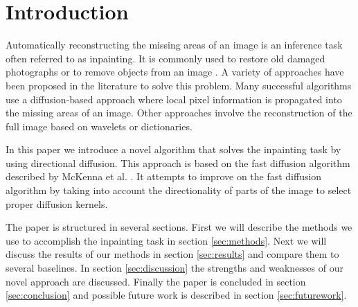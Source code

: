 \section{Introduction}
\label{sec:introduction}

Automatically reconstructing the missing areas of an image is an inference task often referred to as inpainting. It is commonly used to restore old damaged photographs or to remove objects from an image \cite{bertalmio2000image}. A variety of approaches have been proposed in the literature to solve this problem. Many successful algorithms use a diffusion-based approach where local pixel information is propagated into the missing areas of an image. Other approaches involve the reconstruction of the full image based on wavelets or dictionaries.

In this paper we introduce a novel algorithm that solves the inpainting task by using  directional diffusion. This approach is based on the fast diffusion algorithm described by McKenna et al. \cite{richard2001fast}. It attempts to improve on the fast diffusion algorithm by taking into account the directionality of parts of the image to select proper diffusion kernels.

The paper is structured in several sections. First we will describe the methods we use to accomplish the inpainting task in section \ref{sec:methods}. Next we will discuss the results of our methods in section \ref{sec:results} and compare them to several baselines. In section \ref{sec:discussion} the strengths and weaknesses of our novel approach are discussed. Finally the paper is concluded in section \ref{sec:conclusion} and possible future work is described in section \ref{sec:futurework}.
